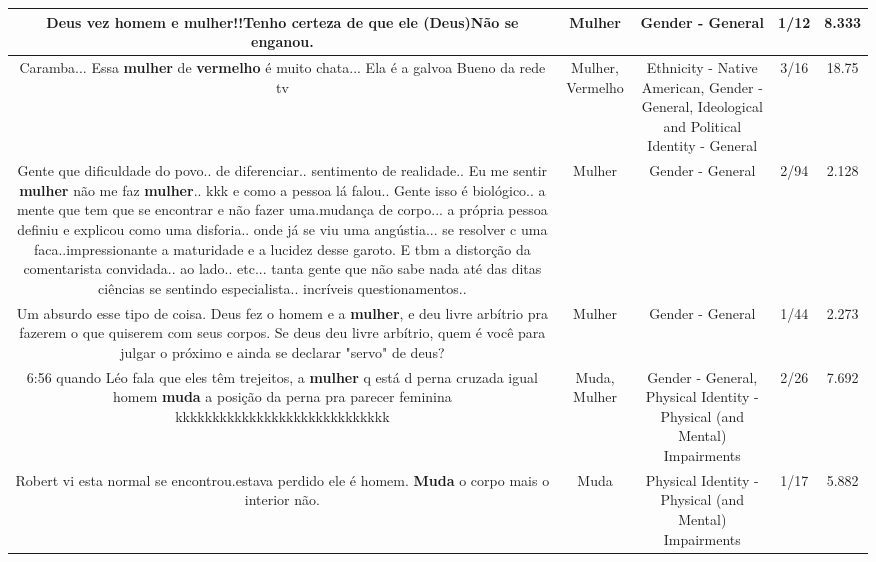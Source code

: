 \documentclass[11pt]{article}
\newlength\mylength
\begin{document}
\begin{center}
\begin{longtable}{|C{.65\mylength}|C{.30\mylength}|C{.12\mylength}|C{.12\mylength}|C{.12\mylength}|}
  \small Deus vez homem e \textbf{mulher}!!Tenho certeza de que ele (Deus)Não se enganou.\normalsize   & Mulher & Gender - General & 1/12 & 8.333 \\  \hline
  \small Caramba... Essa \textbf{mulher} de \textbf{v\textbf{ermelho}} é muito chata... Ela é a galvoa Bueno da rede tv\normalsize   & Mulher, Vermelho & Ethnicity - Native American, Gender - General, Ideological and Political Identity - General & 3/16 & 18.75 \\  \hline
  \small Gente que dificuldade do povo.. de diferenciar.. sentimento de realidade.. Eu me sentir \textbf{mulher} não me faz \textbf{mulher}..  kkk e como a pessoa lá falou.. Gente isso é biológico.. a mente que tem que se encontrar e não fazer uma.mudança de corpo... a própria pessoa definiu e explicou como uma disforia.. onde já se viu uma angústia... se resolver c uma faca..impressionante a maturidade e a lucidez desse garoto.  E tbm a distorção da comentarista convidada.. ao lado.. etc... tanta gente que não sabe nada até das ditas ciências se sentindo especialista.. incríveis questionamentos..\normalsize   & Mulher & Gender - General & 2/94 & 2.128 \\  \hline
  \small Um absurdo esse tipo de coisa. Deus fez o homem e a \textbf{mulher}, e deu livre arbítrio pra fazerem o que quiserem com seus corpos. Se deus deu livre arbítrio, quem é você para julgar o próximo e ainda se declarar "servo" de deus?\normalsize   & Mulher & Gender - General & 1/44 & 2.273 \\  \hline
  \small 6:56 quando Léo fala que eles têm trejeitos, a \textbf{mulher} q está d perna cruzada igual homem \textbf{muda} a posição da perna pra parecer feminina kkkkkkkkkkkkkkkkkkkkkkkkkkkkk\normalsize   & Muda, Mulher & Gender - General, Physical Identity - Physical (and Mental) Impairments & 2/26 & 7.692 \\  \hline
  \small Robert vi esta normal se encontrou.estava perdido ele é  homem. \textbf{Muda} o corpo mais o interior  não.\normalsize   & Muda & Physical Identity - Physical (and Mental) Impairments & 1/17 & 5.882 \\  \hline

\end{longtable}
\end{center}
\end{document}
